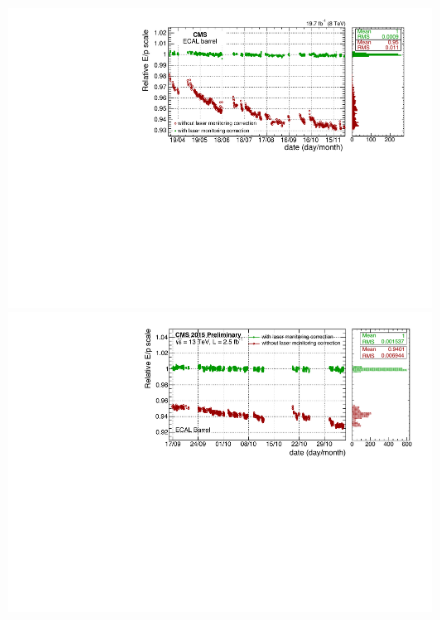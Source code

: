 \begin{figure}
\begin{center}
    \includegraphics[width=0.8\linewidth]{figs/cms/stabilityEB.pdf}
    \includegraphics[width=0.8\linewidth]{figs/cms/EB___history_vsTime.pdf}
\end{center}
\caption{\label{fig:wenuEB}
}
\end{figure}
